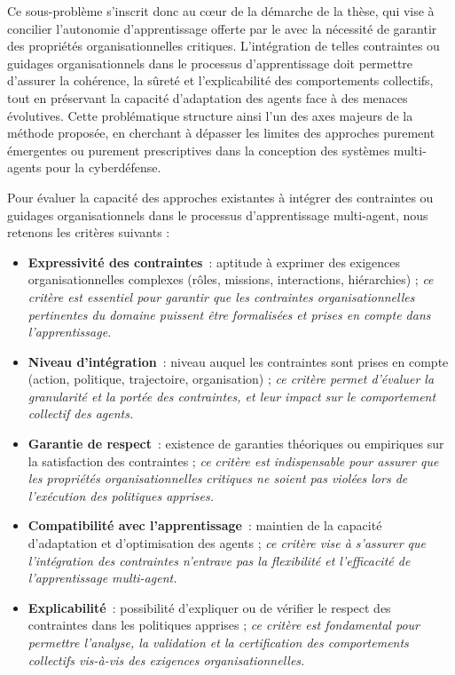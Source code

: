 Ce sous-problème s'inscrit donc au cœur de la démarche de la thèse, qui vise à concilier l'autonomie d'apprentissage offerte par le  avec la nécessité de garantir des propriétés organisationnelles critiques. L'intégration de telles contraintes ou guidages organisationnels dans le processus d'apprentissage doit permettre d'assurer la cohérence, la sûreté et l'explicabilité des comportements collectifs, tout en préservant la capacité d'adaptation des agents face à des menaces évolutives. Cette problématique structure ainsi l'un des axes majeurs de la méthode proposée, en cherchant à dépasser les limites des approches purement émergentes ou purement prescriptives dans la conception des systèmes multi-agents pour la cyberdéfense.

Pour évaluer la capacité des approches existantes à intégrer des contraintes ou guidages organisationnels dans le processus d'apprentissage multi-agent, nous retenons les critères suivants :
\begin{itemize}
    \item \textbf{Expressivité des contraintes}~: aptitude à exprimer des exigences organisationnelles complexes (rôles, missions, interactions, hiérarchies) ; \emph{ce critère est essentiel pour garantir que les contraintes organisationnelles pertinentes du domaine puissent être formalisées et prises en compte dans l'apprentissage.}
    \item \textbf{Niveau d’intégration}~: niveau auquel les contraintes sont prises en compte (action, politique, trajectoire, organisation) ; \emph{ce critère permet d'évaluer la granularité et la portée des contraintes, et leur impact sur le comportement collectif des agents.}
    \item \textbf{Garantie de respect}~: existence de garanties théoriques ou empiriques sur la satisfaction des contraintes ; \emph{ce critère est indispensable pour assurer que les propriétés organisationnelles critiques ne soient pas violées lors de l'exécution des politiques apprises.}
    \item \textbf{Compatibilité avec l’apprentissage}~: maintien de la capacité d’adaptation et d’optimisation des agents ; \emph{ce critère vise à s'assurer que l'intégration des contraintes n'entrave pas la flexibilité et l'efficacité de l'apprentissage multi-agent.}
    \item \textbf{Explicabilité}~: possibilité d’expliquer ou de vérifier le respect des contraintes dans les politiques apprises ; \emph{ce critère est fondamental pour permettre l'analyse, la validation et la certification des comportements collectifs vis-à-vis des exigences organisationnelles.}
\end{itemize}

